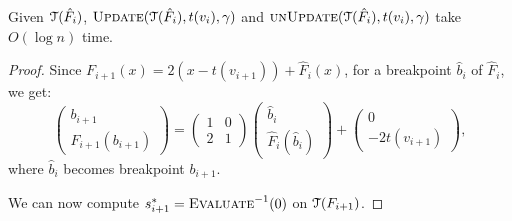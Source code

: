 \documentclass[11pt]{article}
\def\TT{\EuScript{T}}
\def\evali{\mathop{\mbox{\textsc{Evaluate}}}^{-1}}
\def\Update{\mathop{\textsc{Update}}}
\def\UnUpdate{\mathop{\textsc{unUpdate}}}
\newcommand{\hF}{\hat{F}}
\begin{document}
\begin{lemma}\label{lem:tree-update}
Given $\TT(\hF_i)$, $\Update(\TT(\hF_i), t(v_i), \gamma)$ and $\UnUpdate(\TT(\hF_i), t(v_i), \gamma)$ take $O(\log n)$ time.
\end{lemma}
\begin{proof}Since $F_{i+1}(x) = 2(x-t(v_{i+1})) + \hF_{i}(x)$, for a breakpoint $\hat{b}_{i}$ of $\hF_{i}$, we get:
\[
\left(\begin{array}{c}b_{i+1} \\ F_{i+1}(b_{i+1})\end{array}\right) = \left(\begin{array}{cc} 1 & 0 \\ 2 & 1 \end{array}\right)\left(\begin{array}{c} \hat{b}_{i} \\ \hF_{i}(\hat{b}_{i}) \end{array}\right) + 
\left(\begin{array}{c} 0 \\ - 2t(v_{i+1}) \end{array}\right), 
\]
where $\hat{b}_{i}$ becomes breakpoint $b_{i+1}$.

We can now compute $s^*_{i+1} = \evali(0)$ on $\TT(F_{i+1})$.


\end{proof}
\end{document}
